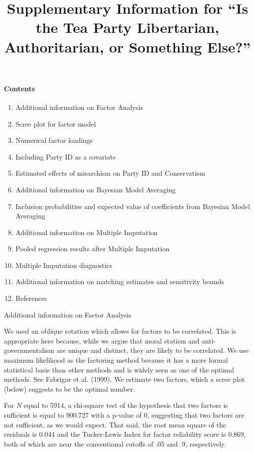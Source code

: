\documentclass[12pt,]{article}
\title{Supplementary Information for ``Is the Tea Party Libertarian, Authoritarian, or Something Else?''
\vspace{1.25em}}
\author{}
\date{}
\begin{document}
\maketitle

\paragraph{Contents}\label{contents}

\begin{enumerate}
\def\labelenumi{\arabic{enumi}.}
\itemsep1pt\parskip0pt
\item
Additional information on Factor Analysis
\item
  Scree plot for factor model
\item
  Numerical factor loadings
\item
  Including Party ID as a covariate
\item
  Estimated effects of misarchism on Party ID and Conservatism
\item
  Additional information on Bayesian Model Averaging
\item
  Inclusion probabilities and expected value of coefficients from Bayesian Model Averaging
\item
  Additional information on Multiple Imputation
\item
  Pooled regression results after Multiple Imputation
\item
  Multiple Imputation diagnostics
\item
Additional information on matching estimates and sensitivity bounds
\item
References
\end{enumerate}

Additional information on Factor Analysis

We used an oblique rotation which allows for factors to be correlated. This is
  appropriate here because, while we argue that moral statism and
  anti-governmentalism are unique and distinct, they are likely to be
  correlated. We use maximum likelihood as the factoring method because
  it has a more formal statistical basis than other methods and is
  widely seen as one of the optimal methods. See Fabrigar et al. (1999). We estimate two factors, which a scree plot (below) suggests to be the optimal number.
  
  For \emph{N} equal to 5914, a chi-square test of the hypothesis that two factors is
  sufficient is equal to 900.727 with a p-value of 0, suggesting that
  two factors are not sufficient, as we would expect. That said, the
  root mean square of the residuals is 0.044 and the Tucker-Lewis Index
  for factor reliability score is 0.869, both of which are near the
  conventional cutoffs of .05 and .9, respectively.
\end{document}
